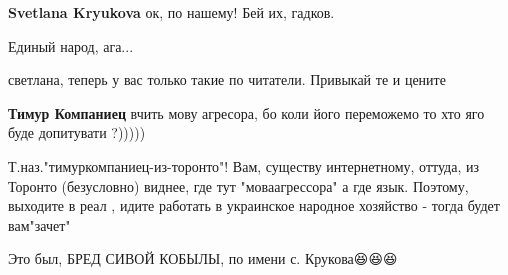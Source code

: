 \begin{itemize}
\begin{itemize}
 
\textbf{Svetlana Kryukova} ок, по нашему! Бей их, гадков.

 
Единый народ, ага...

 
светлана, теперь у вас только такие по читатели. Привыкай те и цените

 
\textbf{Тимур Компаниец} вчить мову агресора, бо коли його переможемо то хто яго буде допитувати ?)))))

 

Т.наз."тимуркомпаниец-из-торонто"! Вам, существу интернетному, оттуда, из
Торонто (безусловно) виднее, где тут "моваагрессора" а где язык. Поэтому,
выходите в реал , идите работать в украинское народное хозяйство - тогда будет
вам"зачет"

 
Это был, БРЕД СИВОЙ КОБЫЛЫ, по имени с. Крукова😆😆😆

 

\end{itemize}
\end{itemize}
